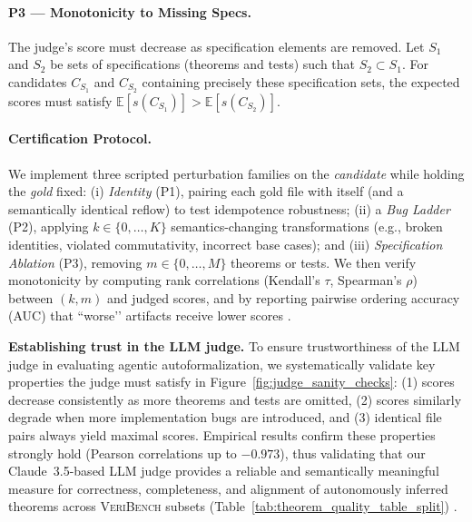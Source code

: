 \paragraph{P3 — Monotonicity to Missing Specs.}
The judge’s score must decrease as specification elements are removed. 
Let $S_1$ and $S_2$ be sets of specifications (theorems and tests) such that $S_2 \subset S_1$. 
For candidates $C_{S_1}$ and $C_{S_2}$ containing precisely these specification sets, the expected scores must satisfy $\mathbb{E}[s(C_{S_1})] > \mathbb{E}[s(C_{S_2})]$.

\paragraph{Certification Protocol.}
We implement three scripted perturbation families on the \emph{candidate} while holding the \emph{gold} fixed: 
(i) \emph{Identity} (P1), pairing each gold file with itself (and a semantically identical reflow) to test idempotence robustness; 
(ii) a \emph{Bug Ladder} (P2), applying $k\!\in\!\{0,\ldots,K\}$ semantics-changing transformations (e.g., broken identities, violated commutativity, incorrect base cases); and 
(iii) \emph{Specification Ablation} (P3), removing $m\!\in\!\{0,\ldots,M\}$ theorems or tests. 
We then verify monotonicity by computing rank correlations (Kendall’s $\tau$, Spearman’s $\rho$) between $(k,m)$ and judged scores, and by reporting pairwise ordering accuracy (AUC) that “worse’’ artifacts receive lower scores \citep{TongZhang2024CodeJudge,Zhuo2024ICEScore}.

\textbf{Establishing trust in the LLM judge.} To ensure trustworthiness of the LLM judge in evaluating agentic autoformalization, we systematically validate key properties the judge must satisfy in Figure~\ref{fig:judge_sanity_checks}: (1) scores decrease consistently as more theorems and tests are omitted, (2) scores similarly degrade when more implementation bugs are introduced, and (3) identical file pairs always yield maximal scores.
Empirical results confirm these properties strongly hold (Pearson correlations up to $-0.973$), thus validating that our Claude~3.5-based LLM judge provides a reliable and semantically meaningful measure for correctness, completeness, and alignment of autonomously inferred theorems across \textsc{VeriBench} subsets (Table~\ref{tab:theorem_quality_table_split}) \citep{Li2024TrustLLMJudgments,Kocmi2024HumanVsLLM}.

